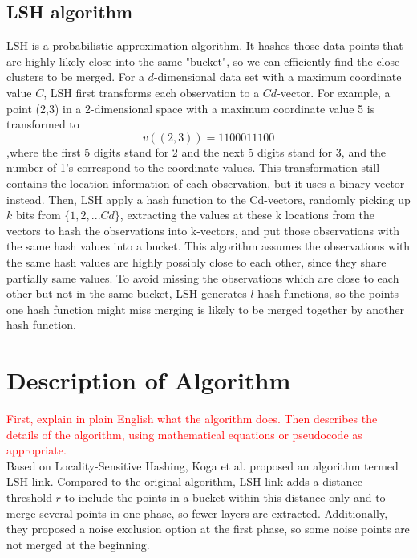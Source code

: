 \documentclass{report}
\begin{document}
\subsection*{LSH algorithm}
LSH is a probabilistic approximation algorithm. It hashes those data points that are highly likely close into the same "bucket", so we can efficiently find the close clusters to be merged. For a $d$-dimensional data set with a maximum coordinate value $C$, LSH first transforms each observation to a $Cd$-vector. For example, a point (2,3) in a 2-dimensional space with a maximum coordinate value 5 is transformed to $$v((2,3)) = 1100011100$$,where the first 5 digits stand for 2 and the next 5 digits stand for 3, and the number of 1's correspond to the coordinate values. This transformation still contains the location information of each observation, but it uses a binary vector instead. Then, LSH apply a hash function to the Cd-vectors, randomly picking up $k$ bits from $\{1,2,...Cd\}$, extracting the values at these k locations from the vectors to hash the observations into k-vectors, and put those observations with the same hash values into a bucket. This algorithm assumes the observations with the same hash values are highly possibly close to each other, since they share partially same values. To avoid missing the observations which are close to each other but not in the same bucket, LSH generates $l$ hash functions, so the points one hash function might miss merging is likely to be merged together by another hash function.

\section*{Description of Algorithm} 
\textcolor{red}{First, explain in plain English what the algorithm does. Then describes the details of the algorithm, using mathematical equations or pseudocode as appropriate.}\\
Based on Locality-Sensitive Hashing,  Koga et al. proposed an algorithm termed LSH-link. Compared to the original algorithm, LSH-link adds a distance threshold $r$ to include the points in a bucket within this distance only and to merge several points in one phase, so fewer layers are extracted. Additionally, they proposed a noise exclusion option at the first phase, so some noise points are not merged at the beginning.
\end{document}
